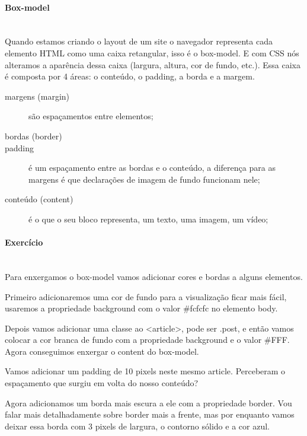 \documentclass[12pt,a4paper]{article}
\begin{document}
	\paragraph{Box-model} \mbox{} \\
	
	Quando estamos criando o layout de um site o navegador representa cada elemento HTML  como uma caixa retangular, isso é o box-model. E com CSS nós alteramos a aparência dessa caixa (largura, altura, cor de fundo, etc.). Essa caixa é composta por 4 áreas: o conteúdo, o padding, a borda e a margem.
	
	\begin{description}
		\item[margens (margin)] são espaçamentos entre elementos;
		
		\item[bordas (border)]
		
		\item[padding] é um espaçamento entre as bordas e o conteúdo, a diferença para as margens é que declarações de imagem de fundo funcionam nele;
		
		\item[conteúdo (content)] é o que o seu bloco representa, um texto, uma imagem, um vídeo;
		
	\end{description}
	
	\paragraph{Exercício} \mbox{} \\
	
	Para enxergamos o box-model vamos adicionar cores e bordas a alguns elementos.
	
	Primeiro adicionaremos uma cor de fundo para a visualização ficar mais fácil, usaremos a propriedade background com o valor \#fcfcfc no elemento body.
	
	Depois vamos adicionar uma classe ao <article>, pode ser .post, e então vamos colocar a cor branca de fundo com a propriedade background e o valor \#FFF. Agora conseguimos enxergar o content do box-model.
	
	Vamos adicionar um padding de 10 pixels neste mesmo article. Perceberam o espaçamento que surgiu em volta do nosso conteúdo?
	
	Agora adicionamos um borda mais escura a ele com a propriedade border. Vou falar mais detalhadamente sobre border mais a frente, mas por enquanto vamos deixar essa borda com 3 pixels de largura, o contorno sólido e a cor azul.
	
\end{document}
